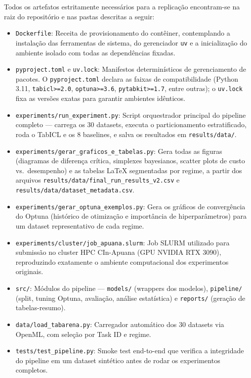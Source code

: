 \documentclass[12pt,a4paper]{article}
\begin{document}
Todos os artefatos estritamente necessários para a replicação encontram-se na raiz do repositório e nas pastas descritas a seguir:

\begin{itemize}
    \item \texttt{Dockerfile}: Receita de provisionamento do contêiner, contemplando a instalação das ferramentas de sistema, do gerenciador \texttt{uv} e a inicialização do ambiente isolado com todas as dependências fixadas.

    \item \texttt{pyproject.toml} e \texttt{uv.lock}: Manifestos determinísticos de gerenciamento de pacotes. O \texttt{pyproject.toml} declara as faixas de compatibilidade (Python 3.11, \texttt{tabicl>=2.0}, \texttt{optuna>=3.6}, \texttt{pytabkit>=1.7}, entre outras); o \texttt{uv.lock} fixa as versões exatas para garantir ambientes idênticos.

    \item \texttt{experiments/run\_experiment.py}: Script orquestrador principal do pipeline completo — carrega os 30 datasets, executa o particionamento estratificado, roda o TabICL e os 8 baselines, e salva os resultados em \texttt{results/data/}.

    \item \texttt{experiments/gerar\_graficos\_e\_tabelas.py}: Gera todas as figuras (diagramas de diferença crítica, simplexes bayesianos, scatter plots de custo vs.\ desempenho) e as tabelas LaTeX segmentadas por regime, a partir dos arquivos \texttt{results/data/final\_run\_results\_v2.csv} e \texttt{results/data/dataset\_metadata.csv}.

    \item \texttt{experiments/gerar\_optuna\_exemplos.py}: Gera os gráficos de convergência do Optuna (histórico de otimização e importância de hiperparâmetros) para um dataset representativo de cada regime.

    \item \texttt{experiments/cluster/job\_apuana.slurm}: Job SLURM utilizado para submissão no cluster HPC CIn-Apuana (GPU NVIDIA RTX 3090), reproduzindo exatamente o ambiente computacional dos experimentos originais.

    \item \texttt{src/}: Módulos do pipeline — \texttt{models/} (wrappers dos modelos), \texttt{pipeline/} (split, tuning Optuna, avaliação, análise estatística) e \texttt{reports/} (geração de tabelas-resumo).

    \item \texttt{data/load\_tabarena.py}: Carregador automático dos 30 datasets via OpenML, com seleção por Task ID e regime.

    \item \texttt{tests/test\_pipeline.py}: Smoke test end-to-end que verifica a integridade do pipeline em um dataset sintético antes de rodar os experimentos completos.
\end{itemize}
\end{document}

